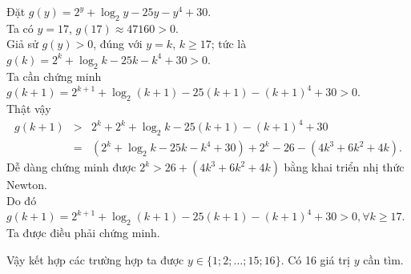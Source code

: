 \begin{ex}
{\begin{itemize}
Đặt $g(y)=2^{y}+\log _{2} y-25 y-y^{4}+30$.\\
Ta có $y=17$, $g(17) \approx 47160>0$.\\
Giả sử $g(y)>0$, đúng với $y=k$, $k \geq 17$; tức là $g(k)=2^{k}+\log _{2} k-25 k-k^{4}+30>0$.\\
Ta cần chứng minh $g(k+1)=2^{k+1}+\log _{2}(k+1)-25(k+1)-(k+1)^{4}+30>0$.\\
Thật vậy
\allowdisplaybreaks
\begin{eqnarray*}
 g(k+1)&>& 2^{k}+2^{k}+\log _{2} k-25(k+1)-(k+1)^{4}+30 \\ 
  &=&  \left(2^{k}+\log _{2} k-25 k-k^{4}+30\right)+2^{k}-26-\left(4 k^{3}+6 k^{2}+4 k\right).
\end{eqnarray*}
Dễ dàng chứng minh được $2^{k}>26+\left(4 k^{3}+6 k^{2}+4 k\right)$ bằng khai triển nhị thức Newton.\\
Do đó $g(k+1)=2^{k+1}+\log _2(k+1)-25(k+1)-(k+1)^{4}+30>0, \forall k \geq 17$.\\
Ta được điều phải chứng minh.
\end{itemize}
Vậy kết hợp các trường hợp ta được $y \in\{1 ; 2 ; \ldots ; 15 ; 16\}$. Có 16 giá trị $y$ cần tìm.
}
\end{ex}
